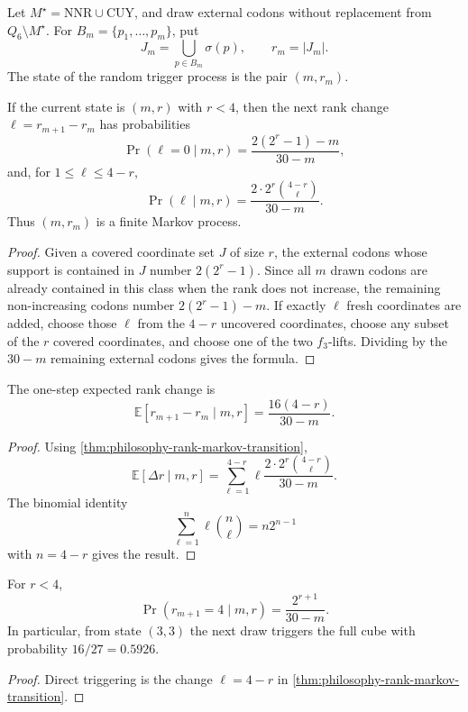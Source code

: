 \begin{definition}
\label{def:philosophy-rank-markov-state}
Let $M^{\star}=\mathrm{NNR}\cup\mathrm{CUY}$, and draw external codons
without replacement from $Q_{6}\setminus M^{\star}$. For
$B_{m}=\{p_{1},\ldots,p_{m}\}$, put
$$
  J_{m}=\bigcup_{p\in B_{m}}\sigma(p),
  \qquad
  r_{m}=|J_{m}|.
$$
The state of the random trigger process is the pair $(m,r_{m})$.
\end{definition}

\begin{theorem}
\label{thm:philosophy-rank-markov-transition}
If the current state is $(m,r)$ with $r<4$, then the next rank change
$\ell=r_{m+1}-r_{m}$ has probabilities
$$
  \Pr(\ell=0\mid m,r)
  =
  \frac{2(2^{r}-1)-m}{30-m},
$$
and, for $1\leq \ell\leq 4-r$,
$$
  \Pr(\ell\mid m,r)
  =
  \frac{2\cdot 2^{r}\binom{4-r}{\ell}}{30-m}.
$$
Thus $(m,r_{m})$ is a finite Markov process.
\end{theorem}
\begin{proof}
Given a covered coordinate set $J$ of size $r$, the external codons
whose support is contained in $J$ number $2(2^{r}-1)$. Since all $m$
drawn codons are already contained in this class when the rank does not
increase, the remaining non-increasing codons number
$2(2^{r}-1)-m$. If exactly $\ell$ fresh coordinates are added, choose
those $\ell$ from the $4-r$ uncovered coordinates, choose any subset of
the $r$ covered coordinates, and choose one of the two $f_{3}$-lifts.
Dividing by the $30-m$ remaining external codons gives the formula.
\end{proof}

\begin{corollary}
\label{cor:philosophy-rank-markov-drift}
The one-step expected rank change is
$$
  \mathbb{E}[r_{m+1}-r_{m}\mid m,r]
  =
  \frac{16(4-r)}{30-m}.
$$
\end{corollary}
\begin{proof}
Using \autoref{thm:philosophy-rank-markov-transition},
$$
  \mathbb{E}[\Delta r\mid m,r]
  =
  \sum_{\ell=1}^{4-r}
  \ell\frac{2\cdot 2^{r}\binom{4-r}{\ell}}{30-m}.
$$
The binomial identity
$$
  \sum_{\ell=1}^{n}\ell\binom{n}{\ell}=n2^{n-1}
$$
with $n=4-r$ gives the result.
\end{proof}

\begin{corollary}
\label{cor:philosophy-direct-trigger-probability}
For $r<4$,
$$
  \Pr(r_{m+1}=4\mid m,r)=\frac{2^{r+1}}{30-m}.
$$
In particular, from state $(3,3)$ the next draw triggers the full cube
with probability $16/27=0.5926$.
\end{corollary}
\begin{proof}
Direct triggering is the change $\ell=4-r$ in
\autoref{thm:philosophy-rank-markov-transition}.
\end{proof}

